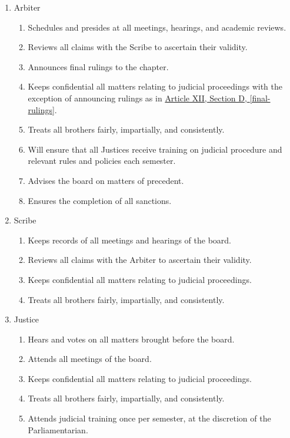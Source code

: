 	\begin{enumerate}

		\item Arbiter
			\begin{enumerate}
				\item Schedules and presides at all meetings, hearings, and academic reviews.
				\item Reviews all claims with the Scribe to ascertain their validity.
				\item Announces final rulings to the chapter. \label{final-rulings}
				\item Keeps confidential all matters relating to judicial proceedings with the exception of announcing rulings as in \hyperref[final-rulings]{Article XII, Section D, \autoref*{final-rulings}}.
				\item Treats all brothers fairly, impartially, and consistently.
				\item Will ensure that all Justices receive training on judicial procedure and relevant rules and policies each semester.
				\item Advises the board on matters of precedent.
				\item Ensures the completion of all sanctions.
			\end{enumerate}

		\item Scribe
			\begin{enumerate}
				\item Keeps records of all meetings and hearings of the board.
				\item Reviews all claims with the Arbiter to ascertain their validity.
				\item Keeps confidential all matters relating to judicial proceedings.
				\item Treats all brothers fairly, impartially, and consistently.
			\end{enumerate}

		\item Justice
			\begin{enumerate}
				\item Hears and votes on all matters brought before the board.
				\item Attends all meetings of the board.
				\item Keeps confidential all matters relating to judicial proceedings.
				\item Treats all brothers fairly, impartially, and consistently.
				\item Attends judicial training once per semester, at the discretion of the Parliamentarian.
			\end{enumerate}


\end{enumerate}
